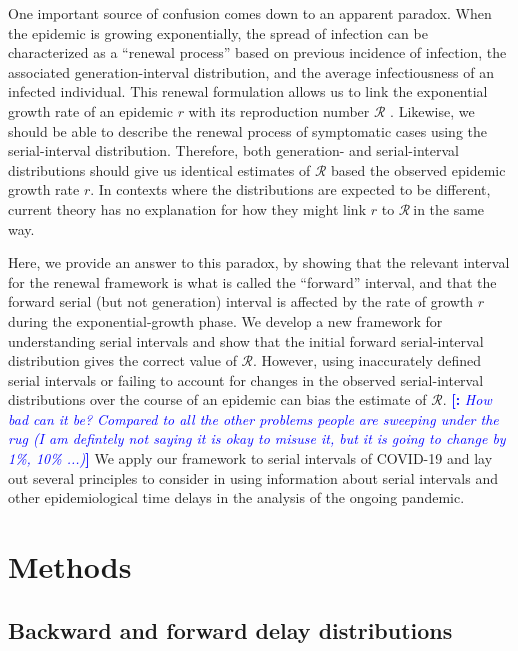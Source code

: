 \documentclass[12pt]{article}
\newcommand{\comment}{\showcomment}
\newcommand{\showcomment}[3]{\textcolor{#1}{\textbf{[#2: }\textsl{#3}\textbf{]}}}
\newcommand{\jd}[1]{\comment{cyan}{JD}{#1}}
\newcommand{\swp}[1]{\comment{magenta}{SWP}{#1}}
\newcommand{\mli}[1]{\comment{blue}{}{#1}}
\newcommand{\Rx}[1]{\ensuremath{{\mathcal R}_{#1}}}
\begin{document}
One important source of confusion comes down to an apparent paradox.
When the epidemic is growing exponentially, the spread of infection can be characterized as a ``renewal process'' based on previous incidence of infection, the associated generation-interval distribution, and the average infectiousness of an infected individual.
This renewal formulation allows us to link the exponential growth rate of an epidemic $r$ with its reproduction number $\mathcal R$ \citep{wallinga2007generation}.
Likewise, we should be able to describe the renewal process of symptomatic cases using the serial-interval distribution.
Therefore, both generation- and serial-interval distributions should give us identical estimates of  $\mathcal R$ based the observed epidemic growth rate $r$.
In contexts where the distributions are expected to be different, current theory has no explanation for how they might link $r$ to \Rx\ in the same way.

Here, we provide an answer to this paradox, by showing that the relevant interval for the renewal framework is what is called the ``forward'' interval, and that the forward serial (but not generation) interval is affected by the rate of growth $r$ during the exponential-growth phase.
We develop a new framework for understanding serial intervals and show that the initial forward serial-interval distribution gives the correct value of $\mathcal R$.
However, using inaccurately defined serial intervals or failing to account for changes in the observed serial-interval distributions over the course of an epidemic can bias the estimate of $\mathcal R$.
\mli{How bad can it be? Compared to all the other problems people are sweeping under the rug (I am defintely not saying it is okay to misuse it, but it is going to change by 1\%, 10\% ...)}
We apply our framework to serial intervals of COVID-19 and lay out several principles to consider in using information about serial intervals and other epidemiological time delays in the analysis of the ongoing pandemic.

\section{Methods}

\subsection{Backward and forward delay distributions}
\end{document}

